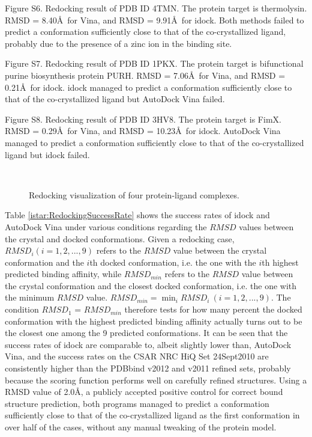 Figure S6. Redocking result of PDB ID 4TMN. The protein target is thermolysin. RMSD = 8.40\AA\ for Vina, and RMSD = 9.91\AA\ for idock. Both methods failed to predict a conformation sufficiently close to that of the co-crystallized ligand, probably due to the presence of a zinc ion in the binding site.

Figure S7. Redocking result of PDB ID 1PKX. The protein target is bifunctional purine biosynthesis protein PURH. RMSD = 7.06\AA\ for Vina, and RMSD = 0.21\AA\ for idock. idock managed to predict a conformation sufficiently close to that of the co-crystallized ligand but AutoDock Vina failed.

Figure S8. Redocking result of PDB ID 3HV8. The protein target is FimX. RMSD = 0.29\AA\ for Vina, and RMSD = 10.23\AA\ for idock. AutoDock Vina managed to predict a conformation sufficiently close to that of the co-crystallized ligand but idock failed.

\begin{figure}
\centering
{}
\\
\caption{Redocking visualization of four protein-ligand complexes.}
\label{istar:RedockingVisualization}
\end{figure}

Table \ref{istar:RedockingSuccessRate} shows the success rates of idock and AutoDock Vina under various conditions regarding the $RMSD$ values between the crystal and docked conformations. Given a redocking case, $RMSD_i (i = 1,2,...,9)$ refers to the $RMSD$ value between the crystal conformation and the $i$th docked conformation, i.e. the one with the $i$th highest predicted binding affinity, while $RMSD_{min}$ refers to the $RMSD$ value between the crystal conformation and the closest docked conformation, i.e. the one with the minimum $RMSD$ value. $RMSD_{min} = \displaystyle\min_{i}RMSD_i\ (i = 1,2,...,9)$. The condition $RMSD_1$ = $RMSD_{min}$ therefore tests for how many percent the docked conformation with the highest predicted binding affinity actually turns out to be the closest one among the 9 predicted conformations. It can be seen that the success rates of idock are comparable to, albeit slightly lower than, AutoDock Vina, and the success rates on the CSAR NRC HiQ Set 24Sept2010 are consistently higher than the PDBbind v2012 and v2011 refined sets, probably because the scoring function performs well on carefully refined structures. Using a RMSD value of 2.0\AA, a publicly accepted positive control for correct bound structure prediction, both programs managed to predict a conformation sufficiently close to that of the co-crystallized ligand as the first conformation in over half of the cases, without any manual tweaking of the protein model.

